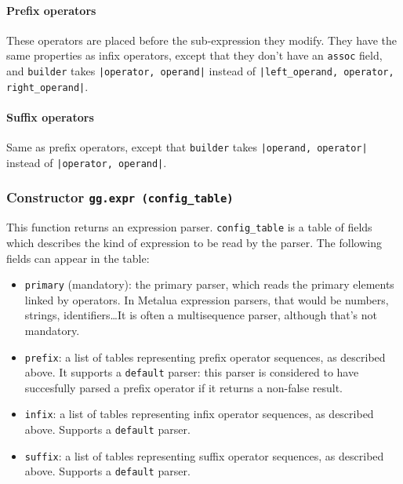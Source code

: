 

\paragraph{Prefix operators}
These operators are placed before the sub-expression they modify. They
have the same properties as infix operators, except that they don't
have an \verb|assoc| field, and \verb|builder| takes {\tt|operator,
  operand|} instead of {\tt|left\_operand, operator, right\_operand|}.

\paragraph{Suffix operators}
Same as prefix operators, except that \verb|builder| takes
{\tt|operand, operator|} instead of {\tt|operator, operand|}.

\subsubsection{Constructor {\tt gg.expr (config\_table)}}

This function returns an expression parser. \verb|config_table|
is a table of fields which describes the kind of expression to be
read by the parser. The following fields can appear in the table:

\begin{itemize}
\item\verb|primary| (mandatory): the primary parser, which reads the
  primary elements linked by operators. In Metalua expression parsers,
  that would be numbers, strings, identifiers\ldots It is often a
  multisequence parser, although that's not mandatory.
\item\verb|prefix|: a list of tables representing prefix operator
  sequences, as described above. It supports a {\tt default} parser:
  this parser is considered to have succesfully parsed a prefix
  operator if it returns a non-false result.
\item\verb|infix|: a list of tables representing infix operator
  sequences, as described above. Supports a {\tt default} parser.
\item\verb|suffix|: a list of tables representing suffix operator
  sequences, as described above. Supports a {\tt default} parser.
\end{itemize}

